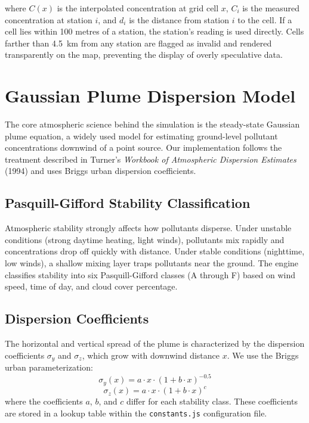 \documentclass[a4paper, 12pt]{report}
\begin{document}
where $C(x)$ is the interpolated concentration at grid cell $x$, $C_i$ is the measured concentration at station $i$, and $d_i$ is the distance from station $i$ to the cell. If a cell lies within 100 metres of a station, the station's reading is used directly. Cells farther than 4.5~km from any station are flagged as invalid and rendered transparently on the map, preventing the display of overly speculative data.

\section{Gaussian Plume Dispersion Model}
The core atmospheric science behind the simulation is the steady-state Gaussian plume equation, a widely used model for estimating ground-level pollutant concentrations downwind of a point source. Our implementation follows the treatment described in Turner's \textit{Workbook of Atmospheric Dispersion Estimates} (1994) and uses Briggs urban dispersion coefficients.

\subsection{Pasquill-Gifford Stability Classification}
Atmospheric stability strongly affects how pollutants disperse. Under unstable conditions (strong daytime heating, light winds), pollutants mix rapidly and concentrations drop off quickly with distance. Under stable conditions (nighttime, low winds), a shallow mixing layer traps pollutants near the ground. The engine classifies stability into six Pasquill-Gifford classes (A through F) based on wind speed, time of day, and cloud cover percentage.

\subsection{Dispersion Coefficients}
The horizontal and vertical spread of the plume is characterized by the dispersion coefficients $\sigma_y$ and $\sigma_z$, which grow with downwind distance $x$. We use the Briggs urban parameterization:
\begin{equation}
\sigma_y(x) = a \cdot x \cdot (1 + b \cdot x)^{-0.5}
\end{equation}
\begin{equation}
\sigma_z(x) = a \cdot x \cdot (1 + b \cdot x)^{c}
\end{equation}
where the coefficients $a$, $b$, and $c$ differ for each stability class. These coefficients are stored in a lookup table within the \texttt{constants.js} configuration file.
\end{document}
